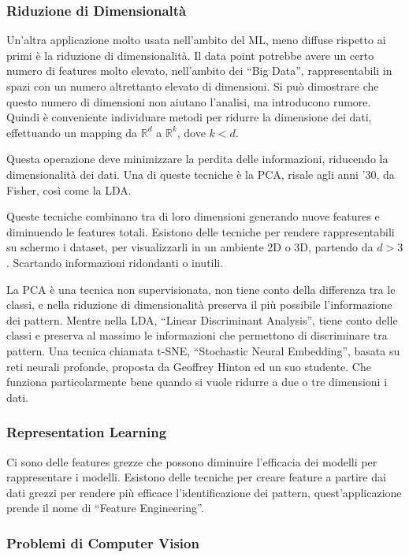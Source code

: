\documentclass{article}
\numberwithin{equation}{subsection}
\begin{document}
\subsubsection{Riduzione di Dimensionaltà}

Un'altra applicazione molto usata nell'ambito del ML, meno diffuse rispetto ai primi è la 
riduzione di dimensionalità. Il data point potrebbe avere un certo numero di features molto 
elevato, nell'ambito dei ``Big Data'', rappresentabili in spazi con un numero altrettanto 
elevato di dimensioni. Si può dimostrare che questo numero di dimensioni non aiutano l'analisi, ma introducono rumore. Quindi è conveniente individuare metodi per ridurre la dimensione dei dati, effettuando un mapping da $\mathbb{R}^d$ a $\mathbb{R}^k$, dove 
$k<d$. 

Questa operazione deve minimizzare la perdita delle informazioni, riducendo la dimensionalità dei dati. 
Una di queste tecniche è la PCA, risale agli anni '30, da Fisher, così come la LDA. 

Queste tecniche combinano tra di loro dimensioni generando nuove features e diminuendo 
le features totali. Esistono delle tecniche per rendere rappresentabili su schermo 
i dataset, per visualizzarli in un ambiente 2D o 3D, partendo da $d>3$. Scartando informazioni ridondanti o inutili. 

La PCA è una tecnica non supervisionata, non tiene conto della differenza tra le classi, e nella riduzione di dimensionalità preserva il più possibile l'informazione dei pattern. Mentre nella LDA, ``Linear Discriminant Analysis'', tiene conto delle classi e preserva al 
massimo le informazioni che permettono di discriminare tra pattern. 
Una tecnica chiamata t-SNE, ``Stochastic Neural Embedding'', basata su reti neurali profonde, proposta da Geoffrey Hinton ed un suo studente. Che funziona particolarmente bene quando si vuole ridurre a due o tre dimensioni i dati. 

\subsubsection{Representation Learning}

Ci sono delle features grezze che possono diminuire l'efficacia dei modelli per rappresentare i modelli. Esistono delle tecniche per creare feature a partire dai dati grezzi per rendere più efficace l'identificazione dei pattern, quest'applicazione prende il nome di ``Feature Engineering''. 

\subsubsection{Problemi di Computer Vision}
\end{document}
